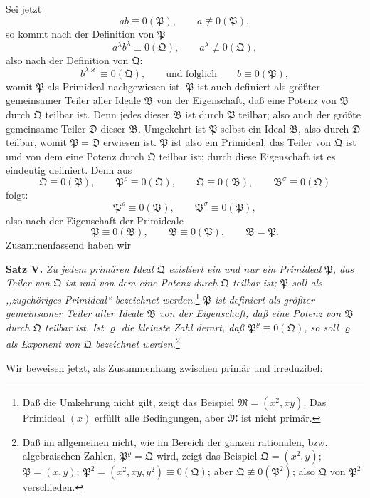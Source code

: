 \documentclass[11pt]{article}
\newcommand{\ideal}[1]{\mathfrak{#1}}
\begin{document}
Sei jetzt
\[
 a b\equiv0(\ideal P),\qquad a\not\equiv0(\ideal P),
\]
so kommt nach der Definition von $\ideal P$
\[
 a^\lambda b^\lambda\equiv0(\ideal Q),\qquad a^\lambda\not\equiv0(\ideal Q),
\]
also nach der Definition von $\ideal Q$:
\[
 b^{\lambda\varkappa}\equiv0(\ideal Q),\qquad\text{und folglich}\qquad b\equiv0(\ideal P),
\]
womit $\ideal P$ als Primideal nachgewiesen ist. $\ideal P$ ist auch definiert als größter gemeinsamer Teiler aller Ideale $\ideal B$ von der Eigenschaft, daß eine Potenz von $\ideal B$ durch $\ideal Q$ teilbar ist. Denn jedes dieser $\ideal B$ ist durch $\ideal P$ teilbar; also auch der größte gemeinsame Teiler $\ideal D$ dieser $\ideal B$. Umgekehrt ist $\ideal P$ selbst ein Ideal $\ideal B$, also durch $\ideal D$ teilbar, womit $\ideal P=\ideal D$ erwiesen ist. $\ideal P$ ist also ein Primideal, das Teiler von $\ideal Q$ ist und von dem eine Potenz durch $\ideal Q$ teilbar ist; durch diese Eigenschaft ist es eindeutig definiert. Denn aus
\[
 \ideal Q\equiv0(\ideal P),\qquad \ideal P^\varrho\equiv0(\ideal Q),
 \qquad
 \ideal Q\equiv0(\ideal B),\qquad \ideal B^\sigma\equiv0(\ideal Q)
\]
folgt:
\[
 \ideal P^\varrho\equiv0(\ideal B),\qquad
 \ideal B^\sigma\equiv0(\ideal P),
\]
also nach der Eigenschaft der Primideale
\[
 \ideal P\equiv0(\ideal B),\qquad \ideal B\equiv0(\ideal P),\qquad \ideal B=\ideal P.
\]
Zusammenfassend haben wir

\textbf{Satz V.} \emph{Zu jedem primären Ideal $\ideal Q$ existiert ein und nur ein Primideal $\ideal P$, das Teiler von $\ideal Q$ ist und von dem eine Potenz durch $\ideal Q$ teilbar ist; $\ideal P$ soll als ,,zugehöriges Primideal`` bezeichnet werden.}\footnote{Daß die Umkehrung nicht gilt, zeigt das Beispiel $\ideal M=(x^2,xy)$. Das Primideal $(x)$ erfüllt alle Bedingungen, aber $\ideal M$ ist nicht primär.} \emph{$\ideal P$ ist definiert als größter gemeinsamer Teiler aller Ideale $\ideal B$ von der Eigenschaft, daß eine Potenz von $\ideal B$ durch $\ideal Q$ teilbar ist. Ist $\varrho$ die kleinste Zahl derart, daß $\ideal P^\varrho\equiv0(\ideal Q)$, so soll $\varrho$ als Exponent von $\ideal Q$ bezeichnet werden.}\footnote{Daß im allgemeinen nicht, wie im Bereich der ganzen rationalen, bzw. algebraischen Zahlen, $\ideal P^\varrho=\ideal Q$ wird, zeigt das Beispiel $\ideal Q=(x^2,y)$; $\ideal P=(x,y)$; $\ideal P^2=(x^2,xy,y^2)\equiv0(\ideal Q)$; aber $\ideal Q\not\equiv0(\ideal P^2)$; also $\ideal Q$ von $\ideal P^2$ verschieden.}

Wir beweisen jetzt, als Zusammenhang zwischen primär und irreduzibel:
\end{document}
